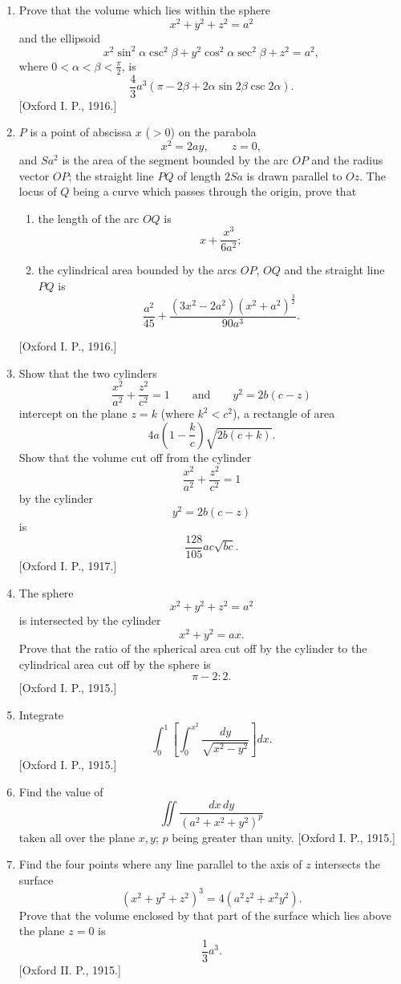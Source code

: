 \documentclass[11pt, a4paper]{article}
\newcommand{\source}[1]{\hfill\textnormal{[#1]}}
\begin{document}
\begin{enumerate}[leftmargin=2em]
\item[46.] Prove that the volume which lies within the sphere
\[
x^2+y^2+z^2=a^2
\]
and the ellipsoid
\[
x^2\sin^2\alpha\csc^2\beta
+y^2\cos^2\alpha\sec^2\beta
+z^2=a^2,
\]
where $0<\alpha<\beta<\frac{\pi}{2}$, is
\[
\frac{4}{3}a^3
\left(\pi-2\beta+2\alpha\sin2\beta\csc2\alpha\right).
\]
\source{Oxford I. P., 1916.}

\item[47.] $P$ is a point of abscissa $x$ ($>0$) on the parabola
\[
x^2=2ay,\qquad z=0,
\]
and $Sa^2$ is the area of the segment bounded by the arc $OP$ and the radius vector $OP$; the straight line $PQ$ of length $2Sa$ is drawn parallel to $Oz$. The locus of $Q$ being a curve which passes through the origin, prove that
\begin{enumerate}[label=(\arabic*)]
\item the length of the arc $OQ$ is
\[
x+\frac{x^3}{6a^2};
\]
\item the cylindrical area bounded by the arcs $OP$, $OQ$ and the straight line $PQ$ is
\[
\frac{a^2}{45}
+\frac{(3x^2-2a^2)(x^2+a^2)^{\frac32}}{90a^3}.
\]
\end{enumerate}
\source{Oxford I. P., 1916.}

\item[48.] Show that the two cylinders
\[
\frac{x^2}{a^2}+\frac{z^2}{c^2}=1
\qquad\text{and}\qquad
y^2=2b(c-z)
\]
intercept on the plane $z=k$ (where $k^2<c^2$), a rectangle of area
\[
4a\left(1-\frac{k}{c}\right)\sqrt{2b(c+k)}.
\]
Show that the volume cut off from the cylinder
\[
\frac{x^2}{a^2}+\frac{z^2}{c^2}=1
\]
by the cylinder
\[
y^2=2b(c-z)
\]
is
\[
\frac{128}{105}ac\sqrt{bc}.
\]
\source{Oxford I. P., 1917.}

\item[49.] The sphere
\[
x^2+y^2+z^2=a^2
\]
is intersected by the cylinder
\[
x^2+y^2=ax.
\]
Prove that the ratio of the spherical area cut off by the cylinder to the cylindrical area cut off by the sphere is
\[
\pi-2:2.
\]
\source{Oxford I. P., 1915.}

\item[50.] Integrate
\[
\int_0^1\left[\int_0^{x^2}\frac{dy}{\sqrt{x^2-y^2}}\right]dx.
\]
\source{Oxford I. P., 1915.}

\item[51.] Find the value of
\[
\iint\frac{dx\,dy}{(a^2+x^2+y^2)^p}
\]
taken all over the plane $x,y$; $p$ being greater than unity.
\source{Oxford I. P., 1915.}

\item[52.] Find the four points where any line parallel to the axis of $z$ intersects the surface
\[
(x^2+y^2+z^2)^3=4(a^2z^2+x^2y^2).
\]
Prove that the volume enclosed by that part of the surface which lies above the plane $z=0$ is
\[
\frac13a^3.
\]
\source{Oxford II. P., 1915.}


\end{enumerate}
\end{document}
